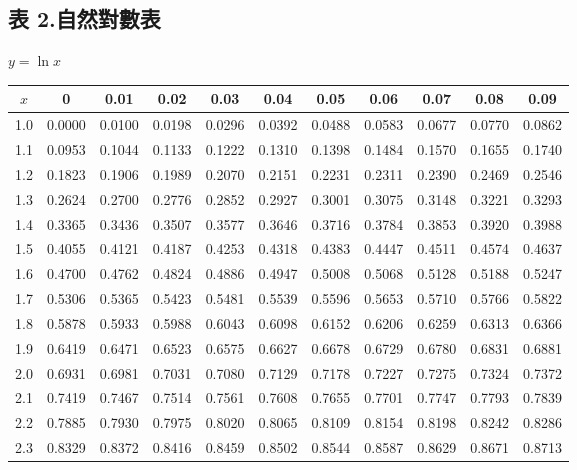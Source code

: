 \subsection*{表 2.\quad 自然對數表}
\begin{center} $y = \ln x$ \end{center}
{\centering\fontsize{7.5pt}{8.8pt}\selectfont\setlength{\tabcolsep}{3.5pt}\renewcommand{\arraystretch}{0.96}
\begin{tabular}{|c|cccccccccc|}
\hline
$x$ & 0 & 0.01 & 0.02 & 0.03 & 0.04 & 0.05 & 0.06 & 0.07 & 0.08 & 0.09 \\ \hline
1.0 & 0.0000 & 0.0100 & 0.0198 & 0.0296 & 0.0392 & 0.0488 & 0.0583 & 0.0677 & 0.0770 & 0.0862 \\
1.1 & 0.0953 & 0.1044 & 0.1133 & 0.1222 & 0.1310 & 0.1398 & 0.1484 & 0.1570 & 0.1655 & 0.1740 \\
1.2 & 0.1823 & 0.1906 & 0.1989 & 0.2070 & 0.2151 & 0.2231 & 0.2311 & 0.2390 & 0.2469 & 0.2546 \\
1.3 & 0.2624 & 0.2700 & 0.2776 & 0.2852 & 0.2927 & 0.3001 & 0.3075 & 0.3148 & 0.3221 & 0.3293 \\
1.4 & 0.3365 & 0.3436 & 0.3507 & 0.3577 & 0.3646 & 0.3716 & 0.3784 & 0.3853 & 0.3920 & 0.3988 \\
\hline
1.5 & 0.4055 & 0.4121 & 0.4187 & 0.4253 & 0.4318 & 0.4383 & 0.4447 & 0.4511 & 0.4574 & 0.4637 \\
1.6 & 0.4700 & 0.4762 & 0.4824 & 0.4886 & 0.4947 & 0.5008 & 0.5068 & 0.5128 & 0.5188 & 0.5247 \\
1.7 & 0.5306 & 0.5365 & 0.5423 & 0.5481 & 0.5539 & 0.5596 & 0.5653 & 0.5710 & 0.5766 & 0.5822 \\
1.8 & 0.5878 & 0.5933 & 0.5988 & 0.6043 & 0.6098 & 0.6152 & 0.6206 & 0.6259 & 0.6313 & 0.6366 \\
1.9 & 0.6419 & 0.6471 & 0.6523 & 0.6575 & 0.6627 & 0.6678 & 0.6729 & 0.6780 & 0.6831 & 0.6881 \\
\hline
2.0 & 0.6931 & 0.6981 & 0.7031 & 0.7080 & 0.7129 & 0.7178 & 0.7227 & 0.7275 & 0.7324 & 0.7372 \\
2.1 & 0.7419 & 0.7467 & 0.7514 & 0.7561 & 0.7608 & 0.7655 & 0.7701 & 0.7747 & 0.7793 & 0.7839 \\
2.2 & 0.7885 & 0.7930 & 0.7975 & 0.8020 & 0.8065 & 0.8109 & 0.8154 & 0.8198 & 0.8242 & 0.8286 \\
2.3 & 0.8329 & 0.8372 & 0.8416 & 0.8459 & 0.8502 & 0.8544 & 0.8587 & 0.8629 & 0.8671 & 0.8713 \\

\end{tabular}}
